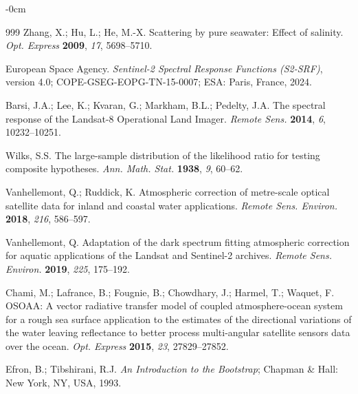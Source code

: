 \documentclass[remotesensing,article,submit,pdftex]{Definitions/mdpi}
\begin{document}
\begin{adjustwidth}{-\extralength}{0cm}
\begin{thebibliography}{999}
Zhang, X.; Hu, L.; He, M.-X. Scattering by pure seawater: Effect of salinity. {\em Opt. Express} {\bf 2009}, {\em 17}, 5698--5710.

European Space Agency. {\em Sentinel-2 Spectral Response Functions (S2-SRF)}, version 4.0; COPE-GSEG-EOPG-TN-15-0007; ESA: Paris, France, 2024.

Barsi, J.A.; Lee, K.; Kvaran, G.; Markham, B.L.; Pedelty, J.A. The spectral response of the Landsat-8 Operational Land Imager. {\em Remote Sens.} {\bf 2014}, {\em 6}, 10232--10251.

Wilks, S.S. The large-sample distribution of the likelihood ratio for testing composite hypotheses. {\em Ann. Math. Stat.} {\bf 1938}, {\em 9}, 60--62.

Vanhellemont, Q.; Ruddick, K. Atmospheric correction of metre-scale optical satellite data for inland and coastal water applications. {\em Remote Sens. Environ.} {\bf 2018}, {\em 216}, 586--597.

Vanhellemont, Q. Adaptation of the dark spectrum fitting atmospheric correction for aquatic applications of the Landsat and Sentinel-2 archives. {\em Remote Sens. Environ.} {\bf 2019}, {\em 225}, 175--192.

Chami, M.; Lafrance, B.; Fougnie, B.; Chowdhary, J.; Harmel, T.; Waquet, F. OSOAA: A vector radiative transfer model of coupled atmosphere-ocean system for a rough sea surface application to the estimates of the directional variations of the water leaving reflectance to better process multi-angular satellite sensors data over the ocean. {\em Opt. Express} {\bf 2015}, {\em 23}, 27829--27852.

Efron, B.; Tibshirani, R.J. {\em An Introduction to the Bootstrap}; Chapman \& Hall: New York, NY, USA, 1993.

\end{thebibliography}

\end{adjustwidth}
\end{document}
